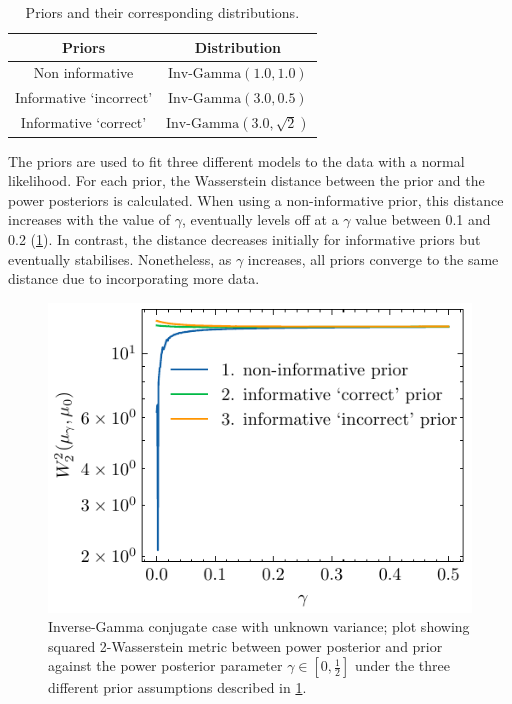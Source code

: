 \documentclass[12pt]{article}
\begin{document}
\begin{table}[h!]
	\caption{Priors and their corresponding distributions.}
	\renewcommand{\arraystretch}{1.5}
	\centering
	\begin{tabular}{cc}
	\toprule
		Priors      & Distribution  \\
		\midrule
		Non informative    &  $\text{Inv-Gamma}(1.0, 1.0)$  \\
		Informative `incorrect'   & $\text{Inv-Gamma}(3.0, 0.5)$    \\
		Informative    `correct'  & $\text{Inv-Gamma}(3.0, \sqrt{2})$\\
		\bottomrule
	\end{tabular}
	\label{priors_invg}
\end{table}

The priors are used to fit three different models to the data with a normal likelihood. For each prior, the Wasserstein distance between the prior and the power posteriors is calculated. When using a non-informative prior, this distance increases with the value of $\gamma$, eventually levels off  at a $\gamma$ value between 0.1 and 0.2 (\cref{fig:ing_conju}). In contrast, the distance decreases initially for informative priors but eventually stabilises. Nonetheless, as $\gamma$ increases, all priors converge to the same distance due to incorporating more data.


\begin{figure}[h]
\begin{center}
        \includegraphics{imgs/inv_gamma_wasserstein_distance.pdf}     
\end{center}
        \caption{Inverse-Gamma conjugate case with unknown variance; plot showing squared
2-Wasserstein metric between power posterior and prior against the
power posterior parameter $\gamma \in [0, \frac{1}{2}]$ under the three
different prior assumptions described in  \cref{priors_invg}.}
    \label{fig:ing_conju}
\end{figure}
\FloatBarrier
\end{document}
